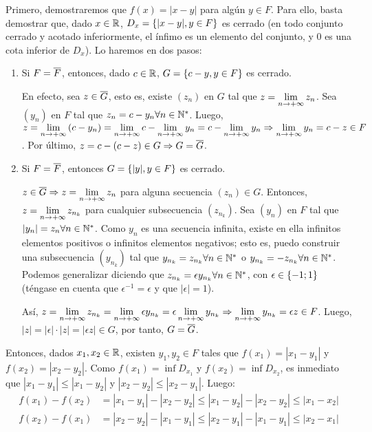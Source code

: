 
{
	Primero, demostraremos que $f(x) = |x-y|$ para algún $y\in F$.
	Para ello, basta demostrar que, dado $x\in\mathbb{R}$, $D_x = \left\{|x-y|, y\in F\right\}$ es cerrado (en todo conjunto cerrado y acotado inferiormente, el ínfimo es un elemento del conjunto, y 0 es una cota inferior de $D_x$).
	Lo haremos en dos pasos:

	\begin{enumerate}
		
		\item 

			Si $F=\overline{F}$, entonces, dado $c\in\mathbb{R}$, $G=\left\{c-y,y\in F\right\}$ es cerrado.

			En efecto, sea $z\in\overline{G}$, esto es, existe $(z_n)$ en $G$ tal que $z = \limite{n}{z_n}$.
			Sea $(y_n)$ en $F$ tal que $z_n = c - y_n \forall n\in\mathbb{N}^*$.
			Luego, $z = \limite{n}{\left(c-y_n\right)} = \limite{n}{c} - \limite{n}{y_n} = c - \limite{n}{y_n} \Rightarrow \limite{n}{y_n} = c - z \in F$.
			Por último, $z = c - (c-z) \in G \Rightarrow G = \overline{G}$.

		\item

			Si $F=\overline{F}$, entonces $G = \left\{|y|, y\in F\right\}$ es cerrado.

			$z\in\cierre{G} \Rightarrow z = \limite{n}{z_n}$ para alguna secuencia $(z_n)\in G$.
			Entonces, $z=\limite{n}{z_{n_k}}$ para cualquier subsecuencia $(z_{n_k})$.
			Sea $(y_n)$ en $F$ tal que $|y_n|=z_n \forall n\in\mathbb{N}^*$.
			Como $y_n$ es una secuencia infinita, existe en ella infinitos elementos positivos o infinitos elementos negativos; esto es, puedo construir una subsecuencia $(y_{n_k})$ tal que $y_{n_k} = z_{n_k}\forall n\in\mathbb{N}^*$ o $y_{n_k} = - z_{n_k}\forall n\in\mathbb{N}^*$.
			Podemos generalizar diciendo que $z_{n_k} = \epsilon y_{n_k} \forall n\in\mathbb{N}^*$, con $\epsilon\in\left\{-1;1\right\}$ (téngase en cuenta que $\epsilon^{-1} = \epsilon$ y que $|\epsilon| = 1$).

			Así, $z = \limite{n}{z_{n_k}} = \limite{n}{\epsilon y_{n_k}} = \epsilon\limite{n}{y_{n_k}} \Rightarrow \limite{n}{y_{n_k}} = \epsilon z \in F$.
			Luego, $|z| = |\epsilon|\cdot|z| = |\epsilon z| \in G$, por tanto, $G=\overline{G}$.

	\end{enumerate}

	Entonces, dados $x_1,x_2\in\mathbb{R}$, existen $y_1,y_2\in F$ tales que $f(x_1) = |x_1-y_1|$ y $f(x_2) = |x_2-y_2|$.
	Como $f(x_1) = \inf D_{x_1}$ y $f(x_2) = \inf D_{x_2}$, es inmediato que $|x_1-y_1| \leq |x_1-y_2|$ y $|x_2-y_2| \leq |x_2-y_1|$.
	Luego:
	\begin{align*}
		f(x_1)-f(x_2) &= |x_1-y_1|-|x_2-y_2| \leq |x_1-y_2|-|x_2-y_2| \leq |x_1-x_2| \\
		f(x_2)-f(x_1) &= |x_2-y_2|-|x_1-y_1| \leq |x_2-y_1|-|x_1-y_1| \leq |x_2-x_1|
	\end{align*}

}
